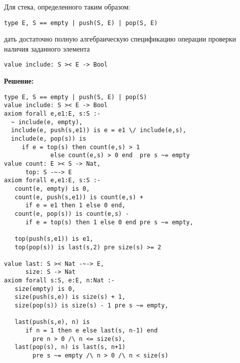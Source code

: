 

\z Для стека, определенного таким образом:
\begin{lstlisting}
type E, S == empty | push(S, E) | pop(S, E)
\end{lstlisting}
дать достаточно полную алгебраическую спецификацию операции проверки наличия заданного элемента
\begin{lstlisting}
value include: S >< E -> Bool
\end{lstlisting}

\textbf{Решение:}
\begin{lstlisting}
type E, S == empty | push(S, E) | pop(S)
value include: S >< E -> Bool
axiom forall e,e1:E, s:S :-
  ~ include(e, empty),
  include(e, push(s,e1)) is e = e1 \/ include(e,s),
  include(e, pop(s)) is
     if e = top(s) then count(e,s) > 1
             else count(e,s) > 0 end  pre s ~= empty
value count: E >< S -> Nat,
      top: S -~-> E
axiom forall e,e1:E, s:S :-
   count(e, empty) is 0,
   count(e, push(s,e1)) is count(e,s) +
      if e = e1 then 1 else 0 end,
   count(e, pop(s)) is count(e,s) -
      if e = top(s) then 1 else 0 end pre s ~= empty,

   top(push(s,e1)) is e1,
   top(pop(s)) is last(s,2) pre size(s) >= 2

value last: S >< Nat -~-> E,
      size: S -> Nat
axiom forall s:S, e:E, n:Nat :-
   size(empty) is 0,
   size(push(s,e)) is size(s) + 1,
   size(pop(s)) is size(s) - 1 pre s ~= empty,

   last(push(s,e), n) is
      if n = 1 then e else last(s, n-1) end
        pre n > 0 /\ n <= size(s),
   last(pop(s), n) is last(s, n+1)
        pre s ~= empty /\ n > 0 /\ n < size(s)
\end{lstlisting}

